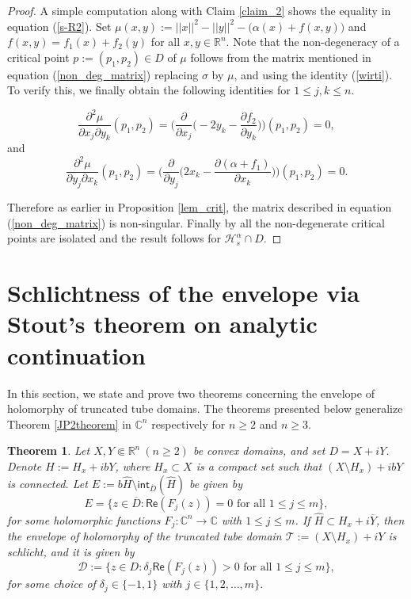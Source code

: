 \documentclass[12pt,reqno, a4paper]{amsart}
\newtheorem{theorem}{Theorem}[section]
\theoremstyle{definition}
\theoremstyle{definition}
\numberwithin{equation}{section}
\def\R{\mathbb{R}}                              %
\def\C{\mathbb{C}}                              %
\begin{document}
	\begin{proof}
	A simple computation along with Claim \ref{claim_2} shows the equality in equation (\ref{s-R2}). Set $\mu(x,y):=||x||^2-||y||^2-\big(\alpha(x)+f(x,y)\big)$ and $f(x,y)=f_1(x)+f_2(y)$ for all $x,y\in\R^n.$ Note that the non-degeneracy of a critical point $p:=(p_1,p_2)\in D$ of $\mu$ follows from the matrix mentioned in equation (\ref{non_deg_matrix}) replacing $\sigma$ by $\mu$, and using the identity (\ref{wirti}). To verify this, we finally obtain the following identities for $1\leq j,k\leq n$.


$$\frac{\partial^2\mu}{\partial x_j\partial {y_k}}(p_1,p_2)     %
=\Big(\frac{\partial}{\partial x_j}\big(-2y_k-\frac{\partial f_2}{\partial y_k}\big)\Big)(p_1,p_2)=0,$$
and 
$$\frac{\partial^2\mu}{\partial y_j\partial {x_k}}(p_1,p_2)%
=\Big(\frac{\partial}{\partial y_j}\big(2x_k-\frac{\partial (\alpha+f_1)}{\partial x_k}\big)\Big)(p_1,p_2)=0.$$

Therefore as earlier in Proposition \ref{lem_crit}, the matrix described in equation (\ref{non_deg_matrix}) is non-singular. Finally by \cite[Corollary 2.3]{milnor} all the non-degenerate critical points are isolated and the result follows for $\mathcal{H}_{s}^{\alpha}\cap D$.
\end{proof}




\section{Schlichtness of the envelope via Stout's theorem on analytic continuation}\label{sec_6}	

In this section, we state and prove two theorems concerning the envelope of holomorphy of truncated tube domains. The theorems presented below generalize Theorem \ref{JP2theorem} in $\C^n$ respectively for $n\geq 2$ and $n\geq 3$. 

\begin{theorem}\label{2nd_theo}
	Let $X,Y\Subset \R^n~(n\geq 2)$ be convex domains, and set ${D=X+iY}$. Denote ${H:=H_x+ibY}$, where $H_x\subset X$ is a compact set such that ${(X\setminus H_x)+ibY}$ is connected. Let $E:=b\widehat{H}\setminus\textsf{int}_{\overline{D}}(\widehat{H})$ be given by $$E=\{z\in \overline{D}: \textsf{Re}(F_j(z))=0 \text{ for all }1\leq j\leq m\},$$ for some holomorphic functions $F_j:\C^n \to \C$ with $1\leq j\leq m$. If $\widehat{H}\subset H_x+i\overline{Y}$, then the envelope of holomorphy of the truncated tube domain $\mathcal{T}:=(X\setminus H_x)+iY$ is schlicht, and it is given by $$\mathcal{D}:=\{z\in D: \delta_j\textsf{Re}(F_j(z))>0 \text{ for all } 1\leq j\leq m\},$$
for some choice of $\delta_j\in\{ -1,1\}$ with $j\in \{1,2,\ldots, m\}.$
\end{theorem}
\end{document}
